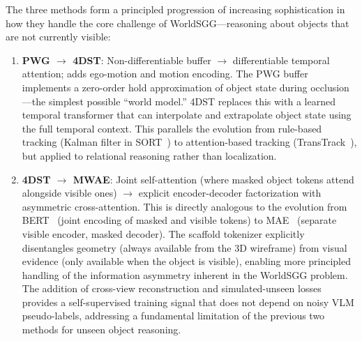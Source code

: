 \documentclass[runningheads]{llncs}
\begin{document}
The three methods form a principled progression of increasing sophistication in how they handle the core challenge of WorldSGG---reasoning about objects that are not currently visible:

\begin{enumerate}
    \item \textbf{PWG $\to$ 4DST}: Non-differentiable buffer $\to$ differentiable temporal attention; adds ego-motion and motion encoding.  The PWG buffer implements a zero-order hold approximation of object state during occlusion---the simplest possible ``world model.''  4DST replaces this with a learned temporal transformer that can interpolate and extrapolate object state using the full temporal context.  This parallels the evolution from rule-based tracking (Kalman filter in SORT~\cite{bewley2016sort}) to attention-based tracking (TransTrack~\cite{sun2020transtrack}), but applied to relational reasoning rather than localization.

    \item \textbf{4DST $\to$ MWAE}: Joint self-attention (where masked object tokens attend alongside visible ones) $\to$ explicit encoder-decoder factorization with asymmetric cross-attention.  This is directly analogous to the evolution from BERT~\cite{devlin2019bert} (joint encoding of masked and visible tokens) to MAE~\cite{he2022masked} (separate visible encoder, masked decoder).  The scaffold tokenizer explicitly disentangles geometry (always available from the 3D wireframe) from visual evidence (only available when the object is visible), enabling more principled handling of the information asymmetry inherent in the WorldSGG problem.  The addition of cross-view reconstruction and simulated-unseen losses provides a self-supervised training signal that does not depend on noisy VLM pseudo-labels, addressing a fundamental limitation of the previous two methods for unseen object reasoning.
\end{enumerate}




\end{document}
